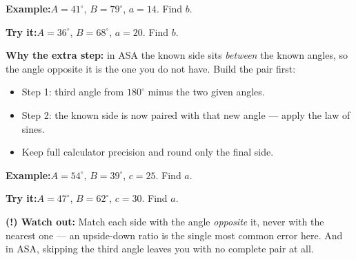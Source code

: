 \documentclass[12pt]{article}
\begin{document}
\begin{examplebox}
\textbf{Example:}\quad $A = 41^\circ$, $B = 79^\circ$, $a = 14$. Find $b$.
\end{examplebox}

\begin{tryitbox}
\textbf{Try it:}\quad $A = 36^\circ$, $B = 68^\circ$, $a = 20$. Find $b$.\\[2pt]
\end{tryitbox}


\begin{formulabox}
\textbf{Why the extra step:} in ASA the known side sits \emph{between} the known angles,
so the angle opposite it is the one you do not have. Build the pair first:
\begin{itemize}[leftmargin=0.8cm, itemsep=0pt, topsep=2pt]
  \item Step 1: third angle from $180^\circ$ minus the two given angles.
  \item Step 2: the known side is now paired with that new angle --- apply the law of sines.
  \item Keep full calculator precision and round only the final side.
\end{itemize}
\end{formulabox}

\begin{examplebox}
\textbf{Example:}\quad $A = 54^\circ$, $B = 39^\circ$, $c = 25$. Find $a$.
\end{examplebox}

\begin{tryitbox}
\textbf{Try it:}\quad $A = 47^\circ$, $B = 62^\circ$, $c = 30$. Find $a$.\\[2pt]
\end{tryitbox}

\begin{watchoutbox}
\textbf{(!) Watch out:} Match each side with the angle \emph{opposite} it, never with the
nearest one --- an upside-down ratio is the single most common error here. And in ASA,
skipping the third angle leaves you with no complete pair at all.
\end{watchoutbox}
\end{document}
